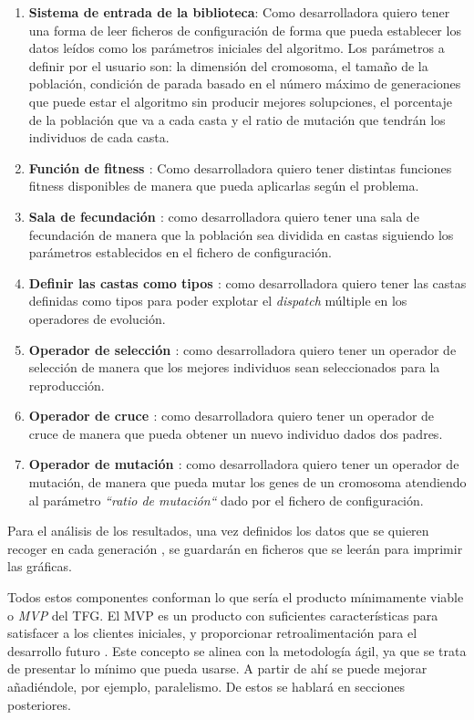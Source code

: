 \begin{enumerate}
    \item \textbf{Sistema de entrada de la biblioteca}: Como desarrolladora quiero tener una forma de leer ficheros de configuración de forma que pueda
    establecer los datos leídos como los parámetros iniciales del algoritmo. Los parámetros a definir por el usuario son: la dimensión del cromosoma, el tamaño de la población, 
    condición de parada basado en el número máximo de generaciones que puede estar el algoritmo sin producir mejores solupciones, el porcentaje de la población que va a cada casta y 
    el ratio de mutación que tendrán los individuos de cada casta.
    \item \textbf{Función de fitness \cite{project_repository_8}}: Como desarrolladora quiero tener distintas funciones fitness disponibles de manera que pueda aplicarlas según 
    el problema.
    \item \textbf{Sala de fecundación \cite{project_repository_17}}: como desarrolladora quiero tener una sala de fecundación de manera que la población sea dividida en castas siguiendo los parámetros establecidos
    en el fichero de configuración.
    \item \textbf{Definir las castas como tipos \cite{project_repository_21}}: como desarrolladora quiero tener las castas definidas como tipos para poder explotar el \emph{dispatch} múltiple en los operadores de evolución.
    \item \textbf{Operador de selección \cite{project_repository_18}}: como desarrolladora quiero tener un operador de selección de manera que los mejores individuos sean seleccionados para la reproducción.
    \item \textbf{Operador de cruce \cite{project_repository_19}}: como desarrolladora quiero tener un operador de cruce de manera que pueda obtener un nuevo individuo dados dos padres.
    \item \textbf{Operador de mutación \cite{project_repository_20}}: como desarrolladora quiero tener un operador de mutación, de manera que pueda mutar los genes de un cromosoma atendiendo al parámetro
    \emph{``ratio de mutación``} dado por el fichero de configuración. 
\end{enumerate}

Para el análisis de los resultados, una vez definidos los datos que se quieren recoger en cada generación \cite{pull_17}, 
se guardarán en ficheros que se leerán para imprimir las gráficas.

Todos estos componentes conforman lo que sería el producto mínimamente viable o \emph{MVP} del TFG. El MVP es un producto
con suficientes características para satisfacer a los clientes iniciales, y proporcionar retroalimentación para el desarrollo futuro \cite{mvp}. 
Este concepto se alinea con la metodología ágil, ya que se trata de presentar lo mínimo que pueda usarse. A partir de ahí se puede mejorar 
añadiéndole, por ejemplo, paralelismo. De estos se hablará en secciones posteriores.